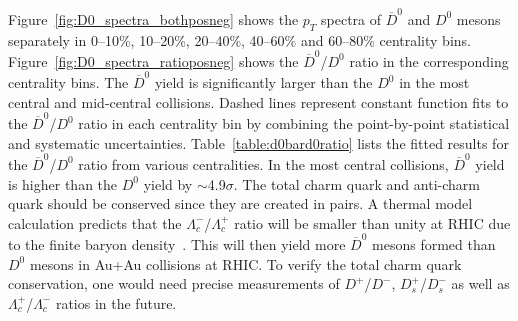\documentclass[%
 reprint,	
 amsmath,amssymb,
 aps,
 prc,
]{revtex4-1}
\begin{document}
Figure~\ref{fig:D0_spectra_bothposneg} shows the $p_{T}$ spectra of $\overline{D}^{0}$ and $D^0$ mesons separately in 0--10\%, 10--20\%, 20--40\%, 40--60\% and 60--80\% centrality bins. Figure~\ref{fig:D0_spectra_ratioposneg} shows the $\overline{D}^{0}$/$D^{0}$ ratio in the corresponding centrality bins. The $\overline{D}^{0}$ yield is significantly larger than the $D^{0}$ in the most central and mid-central collisions. Dashed lines represent constant function fits to the $\overline{D}^{0}$/$D^{0}$ ratio in each centrality bin by combining the point-by-point statistical and systematic uncertainties. Table~\ref{table:d0bard0ratio} lists the fitted results for the $\overline{D}^{0}$/$D^0$ ratio from various centralities. In the most central collisions, $\overline{D}^{0}$ yield is higher than the $D^0$ yield by $\sim$4.9$\sigma$. The total charm quark and anti-charm quark should be conserved since they are created in pairs. A thermal model calculation predicts that the $\Lambda_{c}^-$/$\Lambda_{c}^+$ ratio will be smaller than unity at RHIC due to the finite baryon density~\cite{ANDRONIC200336}. This will then yield more 
$\overline{D}^{0}$ mesons formed than $D^0$ mesons in Au+Au collisions at RHIC. To verify the total charm quark conservation, one would need precise measurements of $D^{+}$/$D^{-}$, $D_{s}^{+}$/$D_{s}^{-}$ as well as $\Lambda_{c}^+$/$\Lambda_{c}^-$ ratios in the future.

\begin{table}[t]
\end{table}
\end{document}
